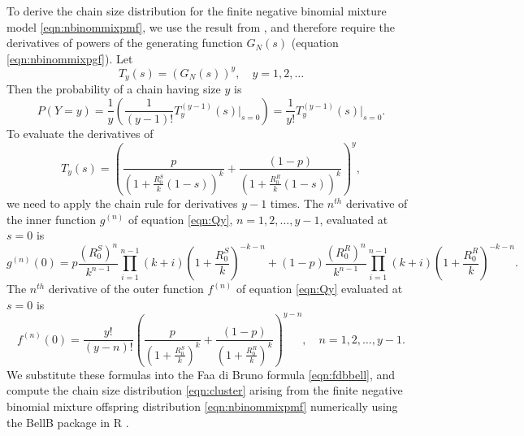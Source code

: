 \documentclass{imammb}
\numberwithin{equation}{section}
\begin{document}
To derive the chain size distribution for the finite negative binomial mixture model \eqref{eqn:nbinommixpmf}, we use the result from \citet{Blumberg2013-xv}, and therefore require the derivatives of powers of the generating function $G_N(s)$ (equation \eqref{eqn:nbinommixpgf}). Let $$T_y(s) =  (G_N(s))^y, \quad y = 1, 2, \dots $$ Then the probability of a chain having size $y$ \citep{Dwass1969-gs, Blumberg2013-xv} is
\begin{equation}\label{eqn:cluster}
    P(Y = y)  =\frac{1}{y}\left( \frac{1}{(y-1)!}T_y^{(y-1)}(s) \Bigr|_{s=0} \right ) =  \frac{1}{y!}T_y^{(y-1)}(s) \Bigr|_{s=0}.
\end{equation}
To evaluate the derivatives of 
\begin{equation}\label{eqn:Qy}
   T_y(s)=  \left (\frac{p}{(1 + \frac{R_0^S}{k}(1-s))^k} +   \frac{(1-p)}{(1 + \frac{R_0^R}{k}(1-s))^k} \right)^y,
\end{equation}
we need to apply the chain rule for derivatives $y-1$ times.
The $n^{th}$ derivative of the inner function $g^{(n)}$ of equation \eqref{eqn:Qy},  $n = 1, 2, \dots, y-1$, evaluated at $s=0$ is
\begin{equation*}
    g^{(n)}(0) =  p \frac{(R_0^S)^n}{k^{n-1}} \displaystyle \prod_{i=1}^{n-1} (k+i) \left(1+\frac{R_0^S}{k}\right)^{-k-n}+ (1-p)\frac{(R_0^R)^n}{k^{n-1}} \displaystyle \prod_{i=1}^{n-1} (k+i)\left (1+\frac{R_0^R}{k}\right)^{-k-n}.
\end{equation*}
The $n^{th}$ derivative of the outer function $f^{(n)}$ of equation \eqref{eqn:Qy} evaluated at $s=0$ is
\begin{equation*}
    f^{(n)}(0) =  \frac{y!}{(y-n)! }\left (\frac{p}{(1 + \frac{R_0^S}{k})^k} +   \frac{(1-p)}{(1 + \frac{R_0^R}{k})^k} \right )^{y-n}, \quad n = 1, 2, \dots, y-1.
\end{equation*}
We substitute these formulas into the Faa di Bruno formula \eqref{eqn:fdbbell}, and compute the chain size distribution \eqref{eqn:cluster} arising from the finite negative binomial mixture offspring distribution \eqref{eqn:nbinommixpmf} numerically using the BellB  package in R \citep{Rajala2019-hs}.


\end{document}
